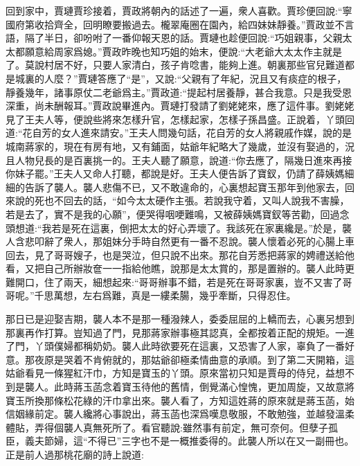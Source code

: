 \begin{parag}
    回到家中，賈璉賈珍接着，賈政將朝內的話述了一遍，衆人喜歡。賈珍便回說:“寧國府第收拾齊全，回明瞭要搬過去。櫳翠庵圈在園內，給四妹妹靜養。”賈政並不言語，隔了半日，卻吩咐了一番仰報天恩的話。賈璉也趁便回說:“巧姐親事，父親太太都願意給周家爲媳。”賈政昨晚也知巧姐的始末，便說:“大老爺大太太作主就是了。莫說村居不好，只要人家清白，孩子肯唸書，能夠上進。朝裏那些官兒難道都是城裏的人麼？”賈璉答應了“是”，又說:“父親有了年紀，況且又有痰症的根子，靜養幾年，諸事原仗二老爺爲主。”賈政道:“提起村居養靜，甚合我意。只是我受恩深重，尚未酬報耳。”賈政說畢進內。賈璉打發請了劉姥姥來，應了這件事。劉姥姥見了王夫人等，便說些將來怎樣升官，怎樣起家，怎樣子孫昌盛。正說着，丫頭回道:“花自芳的女人進來請安。”王夫人問幾句話，花自芳的女人將親戚作媒，說的是城南蔣家的，現在有房有地，又有鋪面，姑爺年紀略大了幾歲，並沒有娶過的，況且人物兒長的是百裏挑一的。王夫人聽了願意，說道:“你去應了，隔幾日進來再接你妹子罷。”王夫人又命人打聽，都說是好。王夫人便告訴了寶釵，仍請了薛姨媽細細的告訴了襲人。襲人悲傷不已，又不敢違命的，心裏想起寶玉那年到他家去，回來說的死也不回去的話，“如今太太硬作主張。若說我守着，又叫人說我不害臊，若是去了，實不是我的心願”，便哭得咽哽難鳴，又被薛姨媽寶釵等苦勸，回過念頭想道:“我若是死在這裏，倒把太太的好心弄壞了。我該死在家裏纔是。”於是，襲人含悲叩辭了衆人，那姐妹分手時自然更有一番不忍說。襲人懷着必死的心腸上車回去，見了哥哥嫂子，也是哭泣，但只說不出來。那花自芳悉把蔣家的娉禮送給他看，又把自己所辦妝奩一一指給他瞧，說那是太太賞的，那是置辦的。襲人此時更難開口，住了兩天，細想起來:“哥哥辦事不錯，若是死在哥哥家裏，豈不又害了哥哥呢。”千思萬想，左右爲難，真是一縷柔腸，幾乎牽斷，只得忍住。
\end{parag}


\begin{parag}
    那日已是迎娶吉期，襲人本不是那一種潑辣人，委委屈屈的上轎而去，心裏另想到那裏再作打算。豈知過了門，見那蔣家辦事極其認真，全都按着正配的規矩。一進了門，丫頭僕婦都稱奶奶。襲人此時欲要死在這裏，又恐害了人家，辜負了一番好意。那夜原是哭着不肯俯就的，那姑爺卻極柔情曲意的承順。到了第二天開箱，這姑爺看見一條猩紅汗巾，方知是寶玉的丫頭。原來當初只知是賈母的侍兒，益想不到是襲人。此時蔣玉菡念着寶玉待他的舊情，倒覺滿心惶愧，更加周旋，又故意將寶玉所換那條松花綠的汗巾拿出來。襲人看了，方知這姓蔣的原來就是蔣玉菡，始信姻緣前定。襲人纔將心事說出，蔣玉菡也深爲嘆息敬服，不敢勉強，並越發溫柔體貼，弄得個襲人真無死所了。看官聽說:雖然事有前定，無可奈何。但孽子孤臣，義夫節婦，這“不得已”三字也不是一概推委得的。此襲人所以在又一副冊也。正是前人過那桃花廟的詩上說道:
\end{parag}


